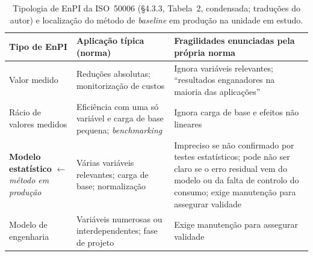 \begin{table}[htbp]
  \centering\footnotesize
  \caption[Tipologia de EnPI da ISO 50006 e localização do método em produção]{Tipologia de EnPI da ISO~50006 (\S4.3.3, Tabela~2, condensada; traduções do autor) e localização do método de \emph{baseline} em produção na unidade em estudo.}
  \label{tab:tipologia-enpi}
  \ntzebra
  \begin{tabularx}{\textwidth}{@{}l X X@{}}
    \toprule
    \textbf{Tipo de EnPI} & \textbf{Aplicação típica (norma)} & \textbf{Fragilidades enunciadas pela própria norma} \\
    \midrule
    Valor medido & Reduções absolutas; monitorização de custos & Ignora variáveis relevantes; \enquote{resultados enganadores na maioria das aplicações} \\
    Rácio de valores medidos & Eficiência com uma só variável e carga de base pequena; \emph{benchmarking} & Ignora carga de base e efeitos não lineares \\
    \textbf{Modelo estatístico} $\leftarrow$ \emph{método em produção} & Várias variáveis relevantes; carga de base; normalização & Impreciso se não confirmado por testes estatísticos; pode não ser claro se o erro residual vem do modelo ou da falta de controlo do consumo; exige manutenção para assegurar validade \\
    Modelo de engenharia & Variáveis numerosas ou interdependentes; fase de projeto & Exige manutenção para assegurar validade \\
    \bottomrule
  \end{tabularx}
\end{table}

